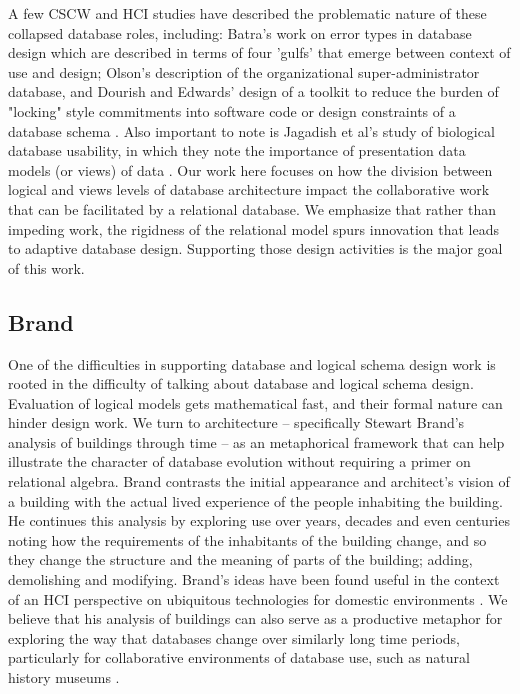 A few CSCW and HCI studies have described the problematic nature of these collapsed database roles, including: Batra's work on error types in database design \cite{Batra_1993} which are described in terms of  four 'gulfs' that emerge between context of use and design; Olson's description of the organizational super-administrator \cite{olson2010} database, and Dourish and Edwards' design of a toolkit to reduce the burden of "locking" style commitments into software code or design constraints of a database schema \cite{Dourish_2000}. Also important to note is Jagadish et al's study of biological database usability, in which they note the importance of presentation data models (or views) of data \cite{jagadish2007making}. Our work here focuses on how the division between logical and views levels of database architecture impact the collaborative work that can be facilitated by a relational database. We emphasize that rather than impeding work, the rigidness of the relational model spurs innovation that leads to adaptive database design. Supporting those design activities is the major goal of this work. 

\subsection{Brand}

One of the difficulties in supporting database and logical schema design work is rooted in the difficulty of talking about database and logical schema design. Evaluation of logical models gets mathematical fast, and their formal nature can hinder design work. We turn to architecture -- specifically Stewart Brand’s analysis of buildings through time \cite{brand1995buildings} -- as an metaphorical framework that can help illustrate the character of database evolution without requiring a primer on relational algebra. Brand contrasts the initial appearance and architect’s vision of a building with the actual lived experience of the people inhabiting the building. He continues this analysis by exploring use over years, decades and even centuries noting how the requirements of the inhabitants of the building change, and so they change the structure and the meaning of parts of the building; adding, demolishing and modifying. Brand’s ideas have been found useful in the context of an HCI perspective on ubiquitous technologies for domestic environments \cite{rodden2003evolution}. We believe that his analysis of buildings can also serve as a productive metaphor for exploring the way that databases change over similarly long time periods, particularly for collaborative environments of database use, such as natural history museums \cite{thomer2014databases}. 

